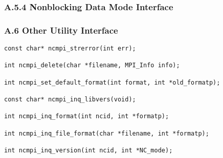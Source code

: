 

\subsubsection*{A.5.4  Nonblocking Data Mode Interface}



\subsubsection*{A.6  Other Utility Interface}

\begin{verbatim}
const char* ncmpi_strerror(int err);

int ncmpi_delete(char *filename, MPI_Info info);

int ncmpi_set_default_format(int format, int *old_formatp);

const char* ncmpi_inq_libvers(void);

int ncmpi_inq_format(int ncid, int *formatp);

int ncmpi_inq_file_format(char *filename, int *formatp);

int ncmpi_inq_version(int ncid, int *NC_mode);
\end{verbatim}

